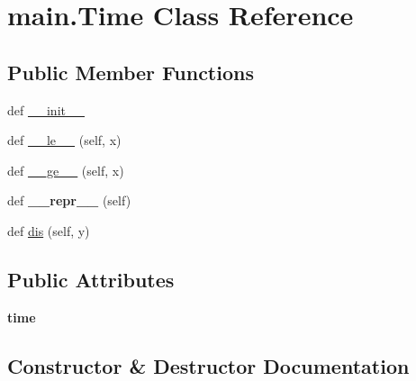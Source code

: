 \hypertarget{classmain_1_1_time}{}\section{main.\+Time Class Reference}
\label{classmain_1_1_time}
\subsection*{Public Member Functions}
\begin{DoxyCompactItemize}
\item 
def \hyperlink{classmain_1_1_time_a0b98682596e4d5ae47dd39524b93dce1}{\+\_\+\+\_\+init\+\_\+\+\_\+}
\item 
def \hyperlink{classmain_1_1_time_aa50ec9969cd5e50958aacf9f664a8d43}{\+\_\+\+\_\+le\+\_\+\+\_\+} (self, x)
\item 
def \hyperlink{classmain_1_1_time_ab78ace96759768be0ab4b6784dd5e8c0}{\+\_\+\+\_\+ge\+\_\+\+\_\+} (self, x)
\item 
\hypertarget{classmain_1_1_time_a45e587371b8913b771d35a65742921cb}{}def {\bfseries \+\_\+\+\_\+repr\+\_\+\+\_\+} (self)\label{classmain_1_1_time_a45e587371b8913b771d35a65742921cb}

\item 
def \hyperlink{classmain_1_1_time_aad960c962856aceb0ce844fd5a25efe3}{dis} (self, y)
\end{DoxyCompactItemize}
\subsection*{Public Attributes}
\begin{DoxyCompactItemize}
\item 
\hypertarget{classmain_1_1_time_a4c963aaa96ef30517354ae7cab268f0c}{}{\bfseries time}\label{classmain_1_1_time_a4c963aaa96ef30517354ae7cab268f0c}

\end{DoxyCompactItemize}


\subsection{Constructor \& Destructor Documentation}
\hypertarget{classmain_1_1_time_a0b98682596e4d5ae47dd39524b93dce1}{}
